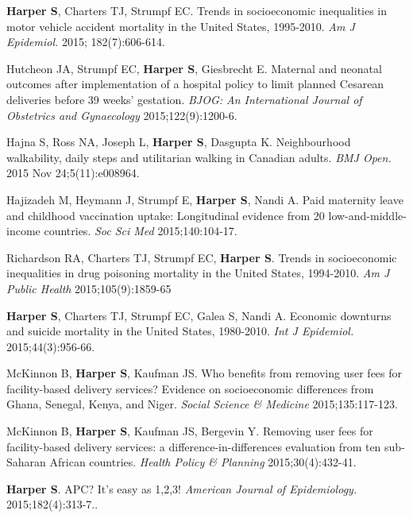 \documentclass[
  letterpaper,
  DIV=11,
  numbers=noendperiod]{scrartcl}
\begin{document}
\begin{etaremune}
\item \textbf{Harper S}, Charters TJ, Strumpf EC. Trends in socioeconomic inequalities in motor vehicle accident mortality in the United States, 1995-2010. \emph{Am J Epidemiol.} 2015; 182(7):606-614.
 
\item Hutcheon JA, Strumpf EC, \textbf{Harper S}, Giesbrecht E. Maternal and neonatal outcomes after implementation of a hospital policy to limit planned Cesarean deliveries before 39 weeks' gestation. \emph{BJOG: An International Journal of Obstetrics and Gynaecology} 2015;122(9):1200-6.
 
\item Hajna S, Ross NA, Joseph L, \textbf{Harper S}, Dasgupta K. Neighbourhood walkability, daily steps and utilitarian walking in Canadian adults. \emph{BMJ Open.} 2015 Nov 24;5(11):e008964.
 
\item *Hajizadeh M, Heymann J, Strumpf E, \textbf{Harper S}, Nandi A. Paid maternity leave and childhood vaccination uptake: Longitudinal evidence from 20 low-and-middle-income countries. \emph{Soc Sci Med} 2015;140:104-17.
 
\item *Richardson RA, Charters TJ, Strumpf EC, \textbf{Harper S}. Trends in socioeconomic inequalities in drug poisoning mortality in the United States, 1994-2010. \emph{Am J Public Health} 2015;105(9):1859-65
 
\item \textbf{Harper S}, Charters TJ, Strumpf EC, Galea S, Nandi A. Economic downturns and suicide mortality in the United States, 1980-2010. \emph{Int J Epidemiol.} 2015;44(3):956-66.
 
\item *McKinnon B, \textbf{Harper S}, Kaufman JS. Who benefits from removing user fees for facility-based delivery services? Evidence on socioeconomic differences from Ghana, Senegal, Kenya, and Niger. \emph{Social Science \& Medicine} 2015;135:117-123.
 
\item *McKinnon B, \textbf{Harper S}, Kaufman JS, Bergevin Y. Removing user fees for facility-based delivery services: a difference-in-differences evaluation from ten sub-Saharan African countries. \emph{Health Policy \& Planning} 2015;30(4):432-41.
 
\item \textbf{Harper S}. APC? It's easy as 1,2,3! \emph{American Journal of Epidemiology.} 2015;182(4):313-7..
 

\end{etaremune}
\end{document}
